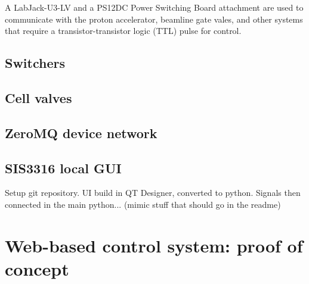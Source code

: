 
A LabJack-U3-LV and a PS12DC Power Switching Board attachment are used to communicate with the proton accelerator, beamline gate vales, and other systems that require a transistor-transistor logic (TTL) pulse for control.



\subsection{Switchers}\label{sec:switcher_control}





\subsection{Cell valves}\label{sec:cell_valve_control}




\subsection{ZeroMQ device network}



\subsection{SIS3316 local GUI}


Setup git repository. UI build in QT Designer, converted to python. Signals then connected in the main python... (mimic stuff that should go in the readme)


\section{Web-based control system: proof of concept}\label{sec:web_control}



